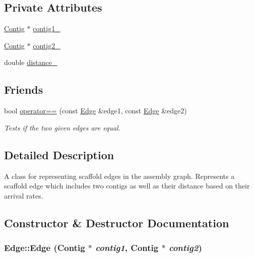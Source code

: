 \subsection*{Private Attributes}
\begin{DoxyCompactItemize}
\item 
\hyperlink{classContig}{Contig} $\ast$ \hyperlink{classEdge_abb45d873178999a3900766ce2f5171e1}{contig1\_\-}
\item 
\hyperlink{classContig}{Contig} $\ast$ \hyperlink{classEdge_a0ec4fe4c2a08117dd32614363aabf11b}{contig2\_\-}
\item 
double \hyperlink{classEdge_aa8b19d16fae843b064205c9da447bf56}{distance\_\-}
\end{DoxyCompactItemize}
\subsection*{Friends}
\begin{DoxyCompactItemize}
\item 
bool \hyperlink{classEdge_a49b989380f52aa039eca454b851cfe88}{operator==} (const \hyperlink{classEdge}{Edge} \&edge1, const \hyperlink{classEdge}{Edge} \&edge2)
\begin{DoxyCompactList}\small\item\em Tests if the two given edges are equal. \item\end{DoxyCompactList}\end{DoxyCompactItemize}


\subsection{Detailed Description}
A class for representing scaffold edges in the assembly graph. Represents a scaffold edge which includes two contigs as well as their distance based on their arrival rates. 

\subsection{Constructor \& Destructor Documentation}
\hypertarget{classEdge_a2004a36608f1b6315e35f52db6dad158}{
\subsubsection[{Edge}]{\setlength{\rightskip}{0pt plus 5cm}Edge::Edge ({\bf Contig} $\ast$ {\em contig1}, \/  {\bf Contig} $\ast$ {\em contig2})}}
\label{classEdge_a2004a36608f1b6315e35f52db6dad158}


